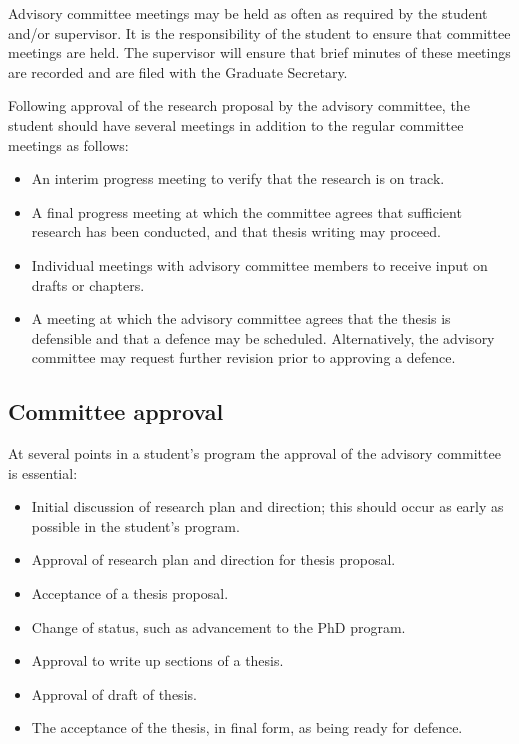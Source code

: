 \documentclass{article}
\begin{document}
Advisory committee meetings may be held as often as required by the student
and/or supervisor. It is the responsibility of the student to ensure that
committee meetings are held. The supervisor will ensure that brief minutes of
these meetings are recorded and are filed with the Graduate Secretary.

Following approval of the research proposal by the advisory committee, the
student should have several meetings in addition to the regular committee
meetings as follows:
\begin{itemize}

\item An interim progress meeting to verify that the research is on track.

\item A final progress meeting at which the committee agrees that sufficient
research has been conducted, and that thesis writing may proceed.

\item Individual meetings with advisory committee members to receive input on drafts or chapters.

\item A meeting at which the advisory committee agrees that the thesis is
defensible and that a defence may be scheduled. Alternatively, the advisory
committee may request further revision prior to approving a defence.

\end{itemize}





\subsection{Committee approval}


At several points in a student's program the approval of the advisory committee is essential:
\begin{itemize}
\item Initial discussion of research plan and direction; this should occur as early as possible in the student's program.
\item Approval of research plan and direction for thesis proposal.
\item Acceptance of a thesis proposal.
\item Change of status, such as advancement to the PhD program.
\item Approval to write up sections of a thesis.
\item Approval of draft of thesis.
\item The acceptance of the thesis, in final form, as being ready for defence.
\end{itemize}
\end{document}
